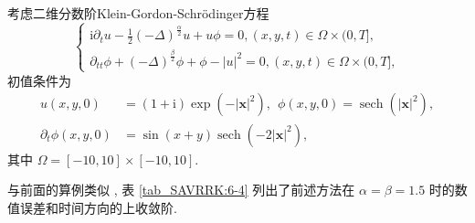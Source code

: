 \begin{example}\label{exp_SAVRRK:4}
考虑二维分数阶Klein-Gordon-Schr{\"o}dinger方程\cite{fuStructurepreservingAlgorithmsTwodimensional2020}
\begin{equation}
\begin{cases}
\mathrm{i} \partial_t u-\frac{1}{2}(-\Delta)^{\frac{\alpha}{2}} u+u \phi=0 , (x , y , t) \in \Omega \times(0 , T] , \\
\partial_{t t} \phi+(-\Delta)^{\frac{\beta}{2}} \phi+\phi-|u|^2=0 , (x , y , t) \in \Omega \times(0 , T] , 
\end{cases}
\end{equation}
初值条件为
\begin{equation}
	\begin{aligned}
		u(x , y , 0)&=(1+\mathrm{i}) \exp \left(-|\boldsymbol{x}|^2\right) , ~~\phi(x , y , 0)=\operatorname{sech}\left(|\boldsymbol{x}|^2\right) , \\
		\partial_t \phi(x , y , 0)&=\sin (x+y) \operatorname{sech}\left(-2|\boldsymbol{x}|^2\right) , 
	\end{aligned}
\end{equation}
其中 $\Omega=[-10 , 10] \times[-10 , 10]$.
\end{example}

与前面的算例类似 , 表 \ref{tab_SAVRRK:6-4} 列出了前述方法在 $\alpha=\beta=1.5$ 时的数值误差和时间方向的上收敛阶.

